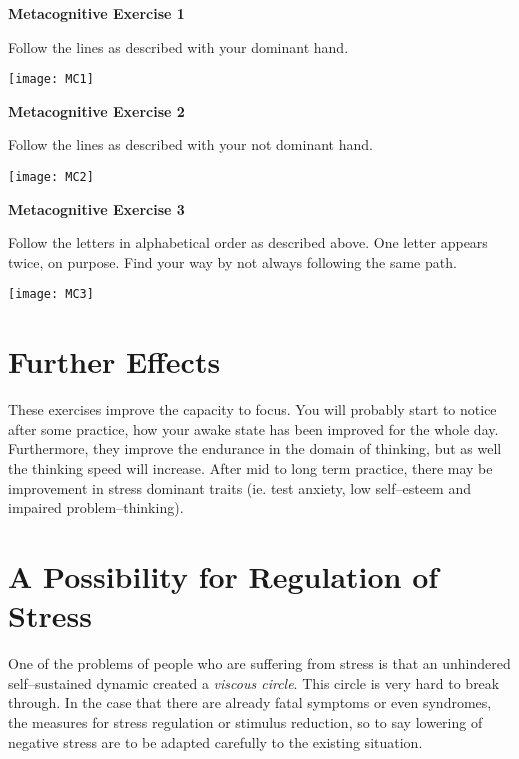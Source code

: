 \documentclass[../main.tex]{subfiles}
\begin{document}
\noindent \textbf{Metacognitive Exercise 1}

\noindent Follow the lines as described with your dominant hand.

\noindent \texttt{[image: MC1]}

\newpage

\noindent \textbf{Metacognitive Exercise 2}

\noindent Follow the lines as described with your not dominant hand.

\noindent \texttt{[image: MC2]}

\newpage


\noindent \textbf{Metacognitive Exercise 3}

\noindent Follow the letters in alphabetical order as described above. One letter appears twice, on purpose. Find your way by not always following the same path.

\noindent \texttt{[image: MC3]}

\newpage

\section{Further Effects}

These exercises improve the capacity to {focus}.
You will probably start to notice after some practice, how your awake state has been improved for the whole day.
Furthermore, they improve the endurance in the domain of thinking,
but as well the {thinking speed will increase}.
After mid to long term practice, there may be improvement in {stress dominant traits} (ie. test anxiety,
low self--esteem and impaired problem--thinking).

\section{A Possibility for Regulation of Stress}


One of the problems of people who are suffering from stress is that an unhindered self--sustained dynamic created a \emph{viscous circle}.
This circle is very hard to break through.
In the case that there are already fatal symptoms or even syndromes, the measures for stress regulation or stimulus reduction,
so to say lowering of negative stress are to be adapted carefully to the existing situation.
\end{document}
